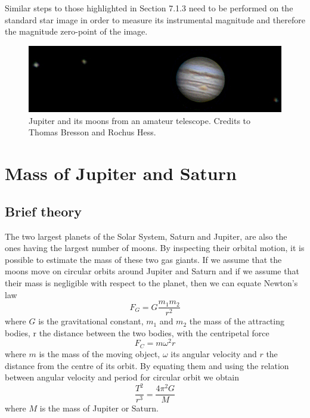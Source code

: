 \documentclass[a4paper, 11pt, fleqn]{memoir}
\begin{document}
Similar steps to those highlighted in Section 7.1.3 need to be performed on the standard star image in order to measure its instrumental magnitude and therefore the magnitude zero-point of the image.

\begin{figure}[t!]
    \centering
    \includegraphics[width=12cm]{jupiter}
    \caption{Jupiter and its moons from an amateur telescope.
        Credits to Thomas Bresson and Rochus Hess.
    }
    \label{fig:jupyter}
\end{figure}

\section{Mass of Jupiter and Saturn}

\subsection{Brief theory}

The two largest planets of the Solar System, Saturn and Jupiter, are also the ones having the largest number of moons.
By inspecting their orbital motion, it is possible to estimate the mass of these two gas giants.
If we assume that the moons move on circular orbits around Jupiter and Saturn and if we assume that their mass is negligible with respect to the planet, then we can equate Newton's law
\begin{equation}
    F_G = G \frac{m_1 m_2}{r^2}
\end{equation}
where $G$ is the gravitational constant,
$m_1$ and $m_2$ the mass of the attracting bodies,
r the distance between the two bodies, with the centripetal force
\begin{equation}
    F_C = m \omega^2 r
\end{equation}
where
$m$ is the mass of the moving object,
$\omega$ its angular velocity and
$r$ the distance from the centre of its orbit.
By equating them and using the relation between angular velocity and period for circular orbit we obtain
\begin{equation}
    \frac{T^2}{r^3} = \frac{4 \pi^2 G}{M}
\end{equation}
where $M$ is the mass of Jupiter or Saturn.
\end{document}
